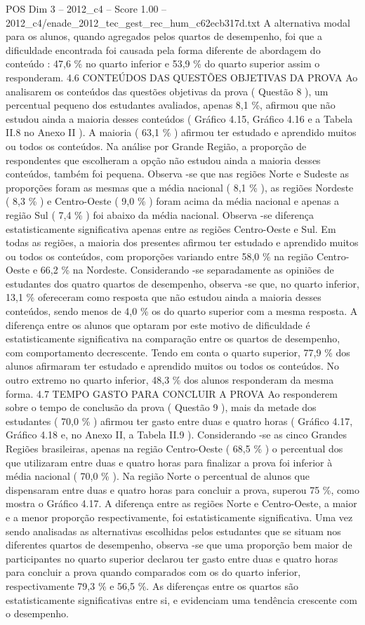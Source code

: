 \begin{textsample}{POS Dim 3 – 2012\_c4 – Score 1.00 – 2012\_c4/enade\_2012\_tec\_gest\_rec\_hum\_c62ecb317d.txt}
A alternativa modal para os alunos, quando agregados pelos quartos de desempenho, foi que a dificuldade encontrada foi causada pela forma diferente de abordagem do conteúdo : 47,6 \% no quarto inferior e 53,9 \% do quarto superior assim o responderam. 4.6 CONTEÚDOS DAS QUESTÕES OBJETIVAS DA PROVA Ao analisarem os conteúdos das questões objetivas da prova ( Questão 8 ), um percentual pequeno dos estudantes avaliados, apenas 8,1 \%, afirmou que não estudou ainda a maioria desses conteúdos ( Gráfico 4.15, Gráfico 4.16 e a Tabela II.8 no Anexo II ).
A maioria ( 63,1 \% ) afirmou ter estudado e aprendido muitos ou todos os conteúdos.
Na análise por Grande Região, a proporção de respondentes que escolheram a opção não estudou ainda a maioria desses conteúdos, também foi pequena.
Observa -se que nas regiões Norte e Sudeste as proporções foram as mesmas que a média nacional ( 8,1 \% ), as regiões Nordeste ( 8,3 \% ) e Centro-Oeste ( 9,0 \% ) foram acima da média nacional e apenas a região Sul ( 7,4 \% ) foi abaixo da média nacional.
Observa -se diferença estatisticamente significativa apenas entre as regiões Centro-Oeste e Sul.
Em todas as regiões, a maioria dos presentes afirmou ter estudado e aprendido muitos ou todos os conteúdos, com proporções variando entre 58,0 \% na região Centro-Oeste e 66,2 \% na Nordeste.
Considerando -se separadamente as opiniões de estudantes dos quatro quartos de desempenho, observa -se que, no quarto inferior, 13,1 \% ofereceram como resposta que não estudou ainda a maioria desses conteúdos, sendo menos de 4,0 \% os do quarto superior com a mesma resposta.
A diferença entre os alunos que optaram por este motivo de dificuldade é estatisticamente significativa na comparação entre os quartos de desempenho, com comportamento decrescente.
Tendo em conta o quarto superior, 77,9 \% dos alunos afirmaram ter estudado e aprendido muitos ou todos os conteúdos.
No outro extremo no quarto inferior, 48,3 \% dos alunos responderam da mesma forma. 4.7 TEMPO GASTO PARA CONCLUIR A PROVA Ao responderem sobre o tempo de conclusão da prova ( Questão 9 ), mais da metade dos estudantes ( 70,0 \% ) afirmou ter gasto entre duas e quatro horas ( Gráfico 4.17, Gráfico 4.18 e, no Anexo II, a Tabela II.9 ).
Considerando -se as cinco Grandes Regiões brasileiras, apenas na região Centro-Oeste ( 68,5 \% ) o percentual dos que utilizaram entre duas e quatro horas para finalizar a prova foi inferior à média nacional ( 70,0 \% ).
Na região Norte o percentual de alunos que dispensaram entre duas e quatro horas para concluir a prova, superou 75 \%, como mostra o Gráfico 4.17.
A diferença entre as regiões Norte e Centro-Oeste, a maior e a menor proporção respectivamente, foi estatisticamente significativa.
Uma vez sendo analisadas as alternativas escolhidas pelos estudantes que se situam nos diferentes quartos de desempenho, observa -se que uma proporção bem maior de participantes no quarto superior declarou ter gasto entre duas e quatro horas para concluir a prova quando comparados com os do quarto inferior, respectivamente 79,3 \% e 56,5 \%.
As diferenças entre os quartos são estatisticamente significativas entre si, e evidenciam uma tendência crescente com o desempenho.


\end{textsample}
